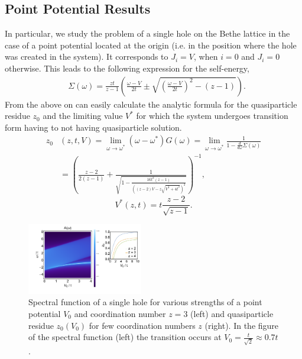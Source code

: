 \documentclass[%
 reprint,
 amsmath,amssymb,
 aps,
prb,
floatfix,
]{revtex4-1}
\begin{document}
\subsection{Point Potential Results}

In particular, we study the problem of a single hole on the Bethe lattice in the case of a point potential located at the origin (i.e. in the position where the hole was created in the system). It corresponds to $J_i = V$, when $i = 0$ and $J_i = 0$ otherwise. This leads to the following expression for the self-energy,
\begin{equation}
\begin{aligned}
&\Sigma(\omega) = \frac{zt}{z-1} \left( \frac{\omega - V}{2t} \pm \sqrt{\left( \frac{\omega - V}{2t} \right)^2 - (z-1)} \right).
\end{aligned}
\end{equation}
From the above on can easily calculate the analytic formula for the quasiparticle residue $z_0$ and the limiting value $V^*$ for which the system undergoes transition form having to not having quasiparticle solution. 
\begin{equation}
\begin{aligned}
z_0&(z,t,V) = \lim_{\omega\to\omega^*}(\omega - \omega^*)G(\omega) = \lim_{\omega\to\omega^*}\frac{1}{1-\frac{d}{d\omega}\Sigma(\omega)} \\ 
&= \left( \frac{z-2}{2(z-1)} + \frac{1}{\sqrt{1 - \frac{16t^2(z-1)}{ \left( (z-2)V-z\sqrt{V^2 + 4t^2} \right)^2}}}  \right)^{-1},
\end{aligned}
\end{equation}
\begin{equation}
V^*(z,t) = t\frac{z-2}{\sqrt{z-1}}.
\end{equation}

\begin{figure}[ht!]
\includegraphics[width=0.45\textwidth]{plot1}
\caption{Spectral function of a single hole for various strengths of a point potential $V_0$ and coordination number $z = 3$ (left) and quasiparticle residue $z_0(V_0)$ for few coordination numbers $z$ (right). In the figure of the spectral function (left) the transition occurs at $V_0 = \frac{t}{\sqrt{2}} \approx 0.7t$.}
\label{pointpotential}
\end{figure}
\end{document}
